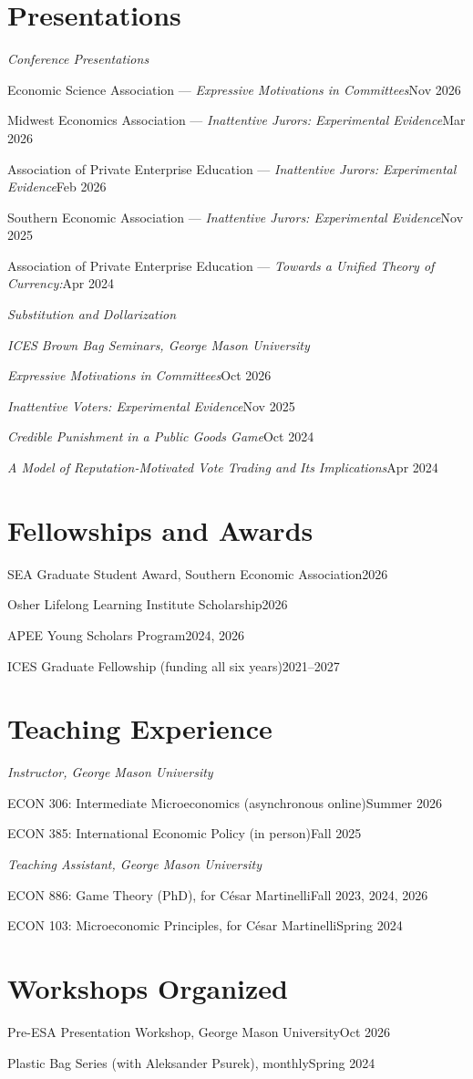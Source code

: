 \documentclass[11pt]{article}
\newcommand{\entry}[2]{#1\hfill#2\par}
\newcommand{\subhead}[1]{\vspace{0.3em}\textit{#1}\par\vspace{0.2em}}
\begin{document}
\section{Presentations}
\subhead{Conference Presentations}
\entry{Economic Science Association --- \emph{Expressive Motivations in Committees}}{Nov 2026}
\entry{Midwest Economics Association --- \emph{Inattentive Jurors: Experimental Evidence}}{Mar 2026}
\entry{Association of Private Enterprise Education --- \emph{Inattentive Jurors: Experimental Evidence}}{Feb 2026}
\entry{Southern Economic Association --- \emph{Inattentive Jurors: Experimental Evidence}}{Nov 2025}
\entry{Association of Private Enterprise Education --- \emph{Towards a Unified Theory of Currency:}}{Apr 2024}
\hspace*{1em}\emph{Substitution and Dollarization}\par

\subhead{ICES Brown Bag Seminars, George Mason University}
\entry{\emph{Expressive Motivations in Committees}}{Oct 2026}
\entry{\emph{Inattentive Voters: Experimental Evidence}}{Nov 2025}
\entry{\emph{Credible Punishment in a Public Goods Game}}{Oct 2024}
\entry{\emph{A Model of Reputation-Motivated Vote Trading and Its Implications}}{Apr 2024}

\section{Fellowships and Awards}
\entry{SEA Graduate Student Award, Southern Economic Association}{2026}
\entry{Osher Lifelong Learning Institute Scholarship}{2026}
\entry{APEE Young Scholars Program}{2024, 2026}
\entry{ICES Graduate Fellowship (funding all six years)}{2021--2027}

\section{Teaching Experience}
\subhead{Instructor, George Mason University}
\entry{ECON 306: Intermediate Microeconomics (asynchronous online)}{Summer 2026}
\entry{ECON 385: International Economic Policy (in person)}{Fall 2025}

\subhead{Teaching Assistant, George Mason University}
\entry{ECON 886: Game Theory (PhD), for C\'esar Martinelli}{Fall 2023, 2024, 2026}
\entry{ECON 103: Microeconomic Principles, for C\'esar Martinelli}{Spring 2024}

\section{Workshops Organized}
\entry{Pre-ESA Presentation Workshop, George Mason University}{Oct 2026}
\entry{Plastic Bag Series (with Aleksander Psurek), monthly}{Spring 2024}
\end{document}
